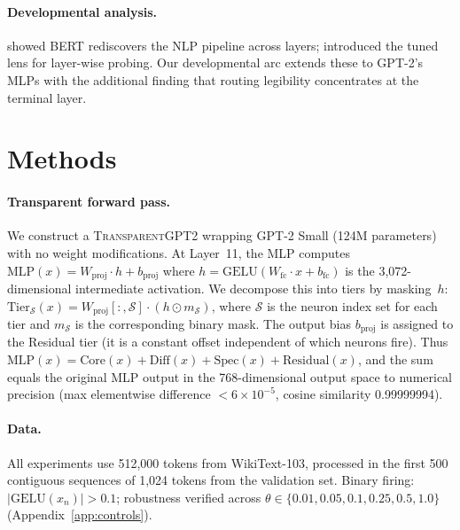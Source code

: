 \documentclass{article}
\begin{document}
\paragraph{Developmental analysis.}
\citet{tenney2019bert} showed BERT rediscovers the NLP pipeline across layers;
\citet{belrose2023eliciting} introduced the tuned lens for layer-wise probing.
Our developmental arc extends these to GPT-2's MLPs with the additional
finding that routing legibility concentrates at the terminal layer.

\section{Methods}

\paragraph{Transparent forward pass.}
We construct a \textsc{TransparentGPT2} wrapping GPT-2 Small (124M parameters)
with no weight modifications.
At Layer~11, the MLP computes $\text{MLP}(x) = W_\text{proj} \cdot h + b_\text{proj}$
where $h = \text{GELU}(W_\text{fc} \cdot x + b_\text{fc})$ is the 3{,}072-dimensional
intermediate activation.
We decompose this into tiers by masking~$h$:
$\text{Tier}_\mathcal{S}(x) = W_\text{proj}[:, \mathcal{S}] \cdot (h \odot m_\mathcal{S})$,
where $\mathcal{S}$ is the neuron index set for each tier and $m_\mathcal{S}$ is
the corresponding binary mask.
The output bias $b_\text{proj}$ is assigned to the Residual tier (it is a
constant offset independent of which neurons fire).
Thus $\text{MLP}(x) = \text{Core}(x) + \text{Diff}(x) + \text{Spec}(x) + \text{Residual}(x)$,
and the sum equals the original MLP output in the 768-dimensional output space
to numerical precision
(max elementwise difference $< 6 \times 10^{-5}$, cosine similarity 0.99999994).

\paragraph{Data.}
All experiments use 512{,}000 tokens from WikiText-103, processed in the
first 500 contiguous sequences of 1{,}024 tokens from the validation set.
Binary firing: $|\text{GELU}(x_n)| > 0.1$; robustness verified across
$\theta \in \{0.01, 0.05, 0.1, 0.25, 0.5, 1.0\}$ (Appendix~\ref{app:controls}).
\end{document}
